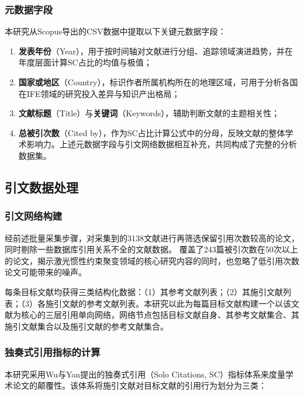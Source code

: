 \documentclass[12pt,hyperref,a4paper,UTF8]{ctexart}
\begin{document}
        \subsubsection{元数据字段}
        本研究从Scopus导出的CSV数据中提取以下关键元数据字段：
        \begin{enumerate}
            \item \textbf{发表年份}（Year），用于按时间轴对文献进行分组、追踪领域演进趋势，并在年度层面计算SC占比的均值与极值；
            \item \textbf{国家或地区}（Country），标识作者所属机构所在的地理区域，可用于分析各国在IFE领域的研究投入差异与知识产出格局；
            \item \textbf{文献标题}（Title）与\textbf{关键词}（Keywords），辅助判断文献的主题相关性；
            \item \textbf{总被引次数}（Cited by），作为SC占比计算公式中的分母，反映文献的整体学术影响力。上述元数据字段与引文网络数据相互补充，共同构成了完整的分析数据集。
        \end{enumerate}

    \subsection{引文数据处理}

        \subsubsection{引文网络构建}

        经前述批量采集步骤，对采集到的3138文献进行再筛选保留引用次数较高的论文，同时剔除一些数据库引用关系不全的文献数据。
        覆盖了243篇被引次数在50次以上的论文，揭示激光惯性约束聚变领域的核心研究内容的同时，也忽略了低引用次数论文可能带来的噪声。
        
        每条目标文献均获得三类结构化数据：（1）其参考文献列表；（2）其施引文献列表；（3）各施引文献的参考文献列表。本研究以此为每篇目标文献构建一个以该文献为核心的三层引用单向网络，网络节点包括目标文献自身、其参考文献集合、其施引文献集合以及施引文献的参考文献集合。

        \subsubsection{独奏式引用指标的计算}

        本研究采用Wu与Yan提出的独奏式引用（Solo Citations, SC）指标体系来度量学术论文的颠覆性\cite{wu2019solo}。该体系将施引文献对目标文献的引用行为划分为三类：    
\end{document}
